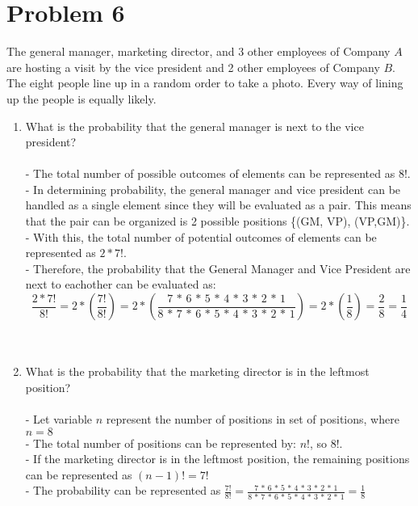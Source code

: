 \documentclass{amsart}
\theoremstyle{definition}
\theoremstyle{Exercise}
\theoremstyle{remark}
\theoremstyle{rule}
\numberwithin{equation}{section}
\begin{document}
  \section*{Problem 6}
The general manager, marketing director, and 3 other employees of Company $A$ are hosting a visit by the vice president and 2 other employees of Company $B$. The eight people line up in a random order to take a photo. Every way of lining up the people is equally likely.
\begin{enumerate}[label=(\alph*)]
  \item What is the probability that the general manager is next to the vice president?
\\\\
  - The total number of possible outcomes of elements can be represented as $8!$.\\
  - In determining probability, the general manager and vice president can be handled as a single element since they will be evaluated as a pair.
  This means that the pair can be organized is 2 possible positions \{(GM, VP), (VP,GM)\}.\\
  - With this, the total number of potential outcomes of elements can be represented as $2 * 7!$.\\
  - Therefore, the probability that the General Manager and Vice President are next to eachother can be evaluated as:
  $$\frac{2 * 7!}{8!} = 2 * \left(\frac{7!}{8!}\right) = 2 * \left(\frac{7\,*\,6\,*\,5\,*\,4\,*\,3\,*\,2\,*\,1}{8\,*\,7\,*\,6\,*\,5\,*\,4\,*\,3\,*\,2\,*\,1}\right) = 2 * \left(\frac{1}{8}\right) = \frac{2}{8} = \frac{1}{4}$$
\\\\
  \item What is the probability that the marketing director is in the leftmost position?
\\\\
  - Let variable $n$ represent the number of positions in set of positions, where $n=8$\\
  - The total number of positions can be represented by: $n!$, so $8!$.\\
  - If the marketing director is in the leftmost position, the remaining positions can be represented as $(n-1)! = 7!$\\
  - The probability can be represented as $\frac{7!}{8!} = \frac{7\,*\,6\,*\,5\,*\,4\,*\,3\,*\,2\,*\,1}{8\,*\,7\,*\,6\,*\,5\,*\,4\,*\,3\,*\,2\,*\,1} = \frac{1}{8}$\\

\end{enumerate}
\end{document}
